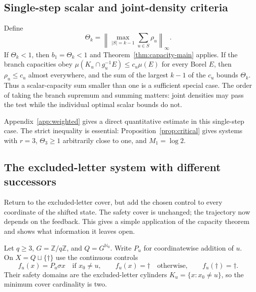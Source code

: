 \documentclass[11pt,reqno]{amsart}
\numberwithin{equation}{section}
\theoremstyle{definition}
\theoremstyle{definition}
\newcommand{\Nzero}{\mathbb N_0}
\begin{document}
\subsection{Single-step scalar and joint-density criteria}
Define
\begin{equation}\label{eq:cap-Theta}
 \Theta_k=\left\|\max_{|S|=k-1}\sum_{u\in S}\rho_u\right\|_\infty.
\end{equation}
If $\Theta_k<1$, then $b_1=\Theta_k<1$ and
Theorem~\ref{thm:capacity-main} applies. If the branch capacities obey
$\mu(K_u\cap g_u^{-1}E)\le c_u\mu(E)$ for every Borel $E$,
then $\rho_u\le c_u$ almost everywhere, and the sum of the largest
$k-1$ of the $c_u$ bounds $\Theta_k$. Thus a scalar-capacity sum
smaller than one is a sufficient special case. The order of taking
the branch supremum and summing matters: joint densities may pass
the test while the individual optimal scalar bounds do not.

Appendix~\ref{app:weighted} gives a direct quantitative estimate in
this single-step case. The strict inequality is essential:
Proposition~\ref{prop:critical} gives systems with $r=3$,
$\Theta_3\ge1$ arbitrarily close to one, and $M_1=\log2$.

\subsection{The excluded-letter system with different successors}
Return to the excluded-letter cover, but add the chosen control to
every coordinate of the shifted state. The safety cover is unchanged;
the trajectory now depends on the feedback. This gives a simple
application of the capacity theorem and shows what information it
leaves open.

Let $q\ge3$, $G=\mathbb Z/q\mathbb Z$, and $Q=G^{\Nzero}$.
Write $P_u$ for coordinatewise addition of $u$. On
$X=Q\sqcup\{\dagger\}$ use the continuous controls
\[
 f_u(x)=P_u\sigma x\quad\text{if }x_0\ne u,
 \qquad f_u(x)=\dagger\quad\text{otherwise},
 \qquad f_u(\dagger)=\dagger.
\]
Their safety domains are the excluded-letter cylinders
$K_u=\{x:x_0\ne u\}$, so the minimum cover cardinality is two.
\end{document}
